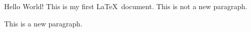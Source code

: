 \documentclass{article}
\begin{document}
Hello World! This is       my       first       \LaTeX\     document.
This is not a new paragraph.

This is a new paragraph.
\end{document}
